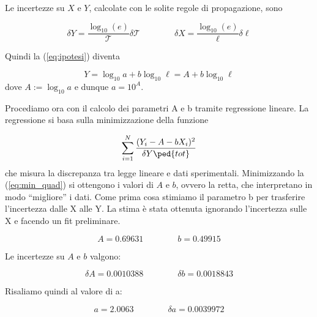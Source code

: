 Le incertezze su $X$ e $Y$, calcolate con le solite regole di propagazione, sono

\begin{equation}
    \delta Y = \frac{\log_{10}(e)}{\mathcal{T}}\delta\mathcal{T}
    \qquad \qquad
    \delta X = \frac{\log_{10}(e)}{\ell}\delta \ell
\end{equation}

Quindi la (\ref{eq:ipotesi}) diventa

\begin{equation}
    Y = \log_{10} a + b \log_{10} \ell = A + b \log_{10} \ell
\end{equation}
%
dove $A := \log_{10} a$ e dunque $a = 10^A$.


Procediamo ora con il calcolo dei parametri A e b tramite regressione lineare. 
La regressione si basa sulla minimizzazione della funzione

\begin{equation}
    \sum_{i=1}^N \frac{(Y_i - A - bX_i)^2}{\delta Y\ped{tot}}
    \label{eq:min_quad}
\end{equation}
%
che misura la discrepanza tra legge lineare e dati sperimentali. Minimizzando la (\ref{eq:min_quad}) si ottengono
i valori di $A$ e $b$, ovvero la retta, che interpretano in modo ``migliore'' i dati.
Come prima cosa stimiamo il parametro b
per trasferire l'incertezza dalle X alle Y. La stima è stata ottenuta ignorando l'incertezza sulle X e facendo un fit preliminare.


\begin{equation}
    A = 0.69631 \qquad \qquad b = 0.49915
\end{equation}

Le incertezze su $A$ e $b$ valgono:

\begin{equation}
    \delta A = 0.0010388 \qquad \qquad \delta b = 0.0018843
\end{equation}

Risaliamo quindi al valore di a:

\begin{equation}
    a = 2.0063 \qquad \qquad \delta a = 0.0039972
\end{equation}
